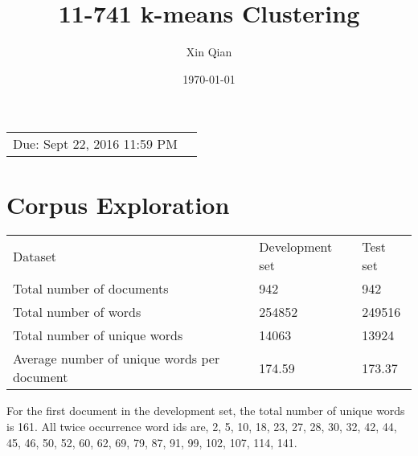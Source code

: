\documentclass{article}
\title{11-741 k-means Clustering} %
\author{Xin Qian} %
\date{\today} %
\begin{document}
\maketitle %

\begin{center}
\begin{tabular}{l r}
Due: Sept 22, 2016 11:59 PM\end{tabular}
\end{center}



\section{Corpus Exploration}
\begin{center}
\begin{tabular}{lll}
Dataset & Development set & Test set \\
Total number of documents & 942 & 942 \\
Total number of words & 254852 &249516\\
Total number of unique words& 14063&13924\\
Average number of unique words per document & 174.59&173.37
\end{tabular}
\end{center}

For the first document in the development set, the total number of unique words is 161. All twice occurrence word ids are,
2, 5, 10, 18, 23, 27, 28, 30, 32, 42, 44, 45, 46, 50, 52, 60, 62, 69, 79, 87, 91, 99, 102, 107, 114, 141.
\end{document}
